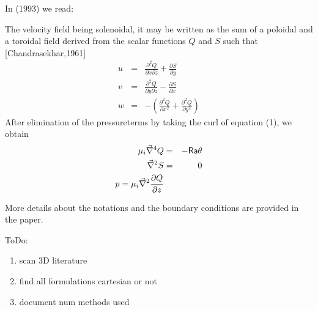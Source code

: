 \noindent In \textcite{rars93} (1993) we read:
\begin{displayquote}
{\color{darkgray}
The velocity field being solenoidal, it may be written as the
sum of a poloidal and a toroidal field derived from the scalar
functions $Q$ and $S$ such that [Chandrasekhar,1961]
\begin{eqnarray}
u &=& \frac{\partial^2 Q}{\partial x \partial z} + \frac{\partial S}{\partial y} \\
v &=& \frac{\partial^2 Q}{\partial y \partial z} - \frac{\partial S}{\partial x} \\
w &=& - \left( \frac{\partial^2 Q}{\partial x^2} + \frac{\partial^2 Q}{\partial y^2} \right) 
\end{eqnarray}
After elimination of the pressureterms by taking the curl of
equation (1), we obtain
\begin{eqnarray}
\mu_i \vec\nabla^4 Q &=& -{\mathsf{Ra}} \theta \\
\vec\nabla^2 S &=& 0 \\
p = \mu_i \vec\nabla^2 \frac{\partial Q}{\partial z}
\end{eqnarray}
}
\end{displayquote}
More details about the notations and the boundary conditions 
are provided in the paper.



\vspace{0.5cm}




{\color{orange}
ToDo:
\begin{enumerate}
\item scan 3D literature 
\item find all formulations cartesian or not
\item document num methods used
\end{enumerate}
}

